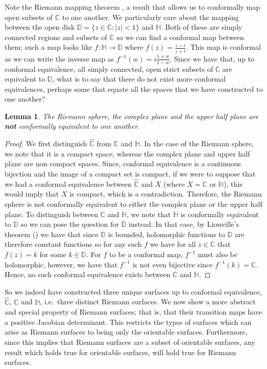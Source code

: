 \documentclass[11pt]{report}
\newtheorem{lemma}[thm]{Lemma}
\theoremstyle{definition}
\begin{document}
Note the Riemann mapping theorem \cite[p.221]{ahlfors}, a result that allows us to conformally map open subsets of $\mathbb{C}$ to one another. We particularly care about the mapping between the open disk $\mathbb{D}=\{z \in \mathbb{C} \colon |z| < 1\}$ and $\mathbb{H}$. Both of these are simply connected regions and subsets of $\mathbb{C}$ so we can find a conformal map between them; such a map looks like $f:\mathbb{H} \rightarrow \mathbb{D}$ where $f(z) = \frac{z-i}{z+i}$. This map is conformal as we can write the inverse map as $f^{-1}(w) = i\frac{1+w}{1-w}$.
Since we have that, up to conformal equivalence, all simply connected, open strict subsets of $\mathbb{C}$ are equivalent to $\mathbb{D}$, what is to say that there do not exist more conformal equivalences, perhaps some that equate all the spaces that we have constructed to one another? 
\begin{lemma}
  The Riemann sphere, the complex plane and the upper half plane are \textbf{not} conformally equivalent to one another.
\end{lemma}
\begin{proof}
  We first distinguish $\widehat{\mathbb{C}}$ from $\mathbb{C}$ and $\mathbb{H}$. In the case of the Riemann sphere, we note that it is a compact space, whereas the complex plane and upper half plane are non compact spaces. Since, conformal equivalence is a continuous bijection and the image of a compact set is compact, if we were to suppose that we had a conformal equivalence between $\widehat{\mathbb{C}}$ and $X$ (where $X = \mathbb{C}$ or $\mathbb{H}$), this would imply that $X$ is compact, which is a contradiction. Therefore, the Riemann sphere is not conformally equivalent to either the complex plane or the upper half plane. 
  To distinguish between $\mathbb{C}$ and $\mathbb{H}$, we note that $\mathbb{H}$ is conformally equivalent to $\mathbb{D}$ so we can pose the question for $\mathbb{D}$ instead. In that case, by Liouville's theorem (\cite[p.122]{ahlfors}) we have that since $\mathbb{D}$ is bounded, holomorphic functions to $\mathbb{D}$ are therefore constant functions so for any such $f$ we have for all $z \in \mathbb{C}$ that $f(z) = k$ for some $k \in \mathbb{D}$. For $f$ to be a conformal map, $f^{-1}$ must also be holomorphic, however, we have that $f^{-1}$ is not even bijective since $f^{-1}(k) = \mathbb{C}$. Hence, no such conformal equivalence exists between $\mathbb{C}$ and $\mathbb{H}$. 
\end{proof}
So we indeed have constructed three unique surfaces up to conformal equivalence, $\widehat{\mathbb{C}}$, $\mathbb{C}$ and $\mathbb{H}$, i.e.\ three distinct Riemann surfaces. We now show a more abstract and special property of Riemann surfaces; that is, that their transition maps have a positive Jacobian determinant. This restricts the types of surfaces which can arise as Riemann surfaces to being only the orientable surfaces. Furthermore, since this implies that Riemann surfaces are a subset of orientable surfaces, any result which holds true for orientable surfaces, will hold true for Riemann surfaces. 
\end{document}
